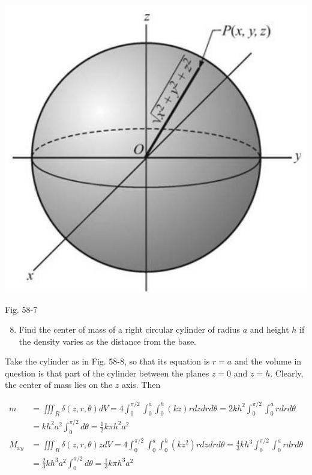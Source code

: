 \documentclass[10pt]{article}
\begin{document}
\begin{center}
\includegraphics[max width=\textwidth]{2024_04_20_fe2e8e718cc0fcd63d1bg-15}
\end{center}

Fig. 58-7

\begin{enumerate}
  \setcounter{enumi}{7}
  \item Find the center of mass of a right circular cylinder of radius $a$ and height $h$ if the density varies as the distance from the base.
\end{enumerate}

Take the cylinder as in Fig. 58-8, so that its equation is $r=a$ and the volume in question is that part of the cylinder between the planes $z=0$ and $z=h$. Clearly, the center of mass lies on the $z$ axis. Then

$$
\begin{aligned}
m & =\iiint_{R} \delta(z, r, \theta) d V=4 \int_{0}^{\pi / 2} \int_{0}^{a} \int_{0}^{h}(k z) r d z d r d \theta=2 k h^{2} \int_{0}^{\pi / 2} \int_{0}^{a} r d r d \theta \\
& =k h^{2} a^{2} \int_{0}^{\pi / 2} d \theta=\frac{1}{2} k \pi h^{2} a^{2} \\
M_{x y} & =\iiint_{R} \delta(z, r, \theta) z d V=4 \int_{0}^{\pi / 2} \int_{0}^{a} \int_{0}^{h}\left(k z^{2}\right) r d z d r d \theta=\frac{4}{3} k h^{3} \int_{0}^{\pi / 2} \int_{0}^{a} r d r d \theta \\
& =\frac{2}{3} k h^{3} a^{2} \int_{0}^{\pi / 2} d \theta=\frac{1}{3} k \pi h^{3} a^{2}
\end{aligned}
$$
\end{document}
